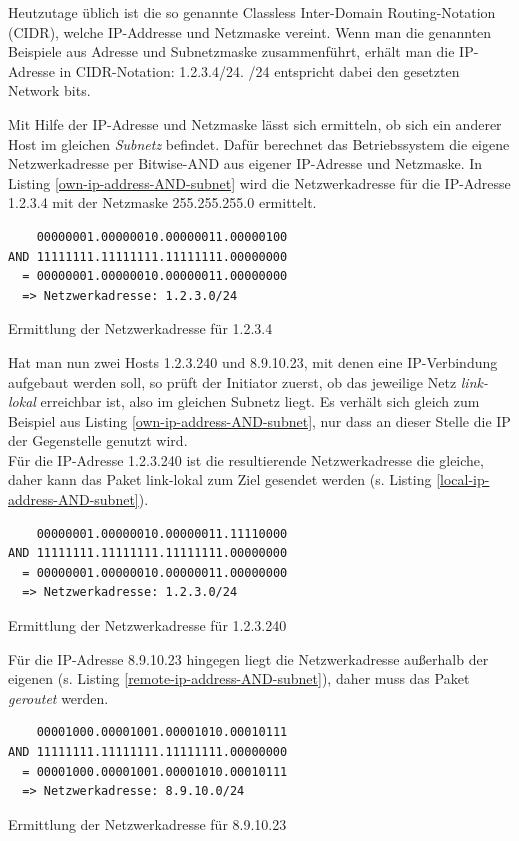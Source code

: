 Heutzutage üblich ist die so genannte Classless Inter-Domain Routing-Notation (\gls{CIDR}), welche IP-Addresse und Netzmaske vereint. Wenn man die genannten Beispiele aus Adresse und Subnetzmaske zusammenführt, erhält man die IP-Adresse in \gls{CIDR}-Notation: 1.2.3.4/24. /24 entspricht dabei den gesetzten Network bits.

Mit Hilfe der IP-Adresse und Netzmaske lässt sich ermitteln, ob sich ein anderer Host im gleichen \textit{Subnetz} befindet. Dafür berechnet das Betriebssystem die eigene Netzwerkadresse per Bitwise-AND aus eigener IP-Adresse und Netzmaske. In Listing \ref{own-ip-address-AND-subnet} wird die Netzwerkadresse für die IP-Adresse 1.2.3.4 mit der Netzmaske 255.255.255.0 ermittelt.
\begin{listing}[h]
\begin{verbatim}
    00000001.00000010.00000011.00000100
AND 11111111.11111111.11111111.00000000
  = 00000001.00000010.00000011.00000000
  => Netzwerkadresse: 1.2.3.0/24
\end{verbatim}
\caption{Ermittlung der Netzwerkadresse für 1.2.3.4}
\label{own-ip-address-AND-subnet}
\end{listing}\FloatBarrier
Hat man nun zwei Hosts 1.2.3.240 und 8.9.10.23, mit denen eine IP-Verbindung aufgebaut werden soll, so prüft der Initiator zuerst, ob das jeweilige Netz \textit{link-lokal} erreichbar ist, also im gleichen Subnetz liegt. Es verhält sich gleich zum Beispiel aus Listing \ref{own-ip-address-AND-subnet}, nur dass an dieser Stelle die IP der Gegenstelle genutzt wird.\\
Für die IP-Adresse 1.2.3.240 ist die resultierende Netzwerkadresse die gleiche, daher kann das Paket link-lokal zum Ziel gesendet werden (s. Listing \ref{local-ip-address-AND-subnet}).

\begin{listing}[h]
\begin{verbatim}
    00000001.00000010.00000011.11110000
AND 11111111.11111111.11111111.00000000
  = 00000001.00000010.00000011.00000000
  => Netzwerkadresse: 1.2.3.0/24
\end{verbatim}
\caption{Ermittlung der Netzwerkadresse für 1.2.3.240}
\label{local-ip-address-AND-subnet}
\end{listing}\FloatBarrier

Für die IP-Adresse 8.9.10.23\label{ip_ausserhalb} hingegen liegt die Netzwerkadresse außerhalb der eigenen (s. Listing \ref{remote-ip-address-AND-subnet}), daher muss das Paket \textit{geroutet} werden.
\begin{listing}[h]
\begin{verbatim}
    00001000.00001001.00001010.00010111
AND 11111111.11111111.11111111.00000000
  = 00001000.00001001.00001010.00010111
  => Netzwerkadresse: 8.9.10.0/24
\end{verbatim}
\caption{Ermittlung der Netzwerkadresse für 8.9.10.23}
\label{remote-ip-address-AND-subnet}
\end{listing}\FloatBarrier

